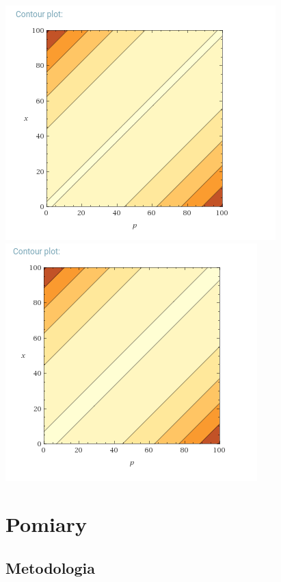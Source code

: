 \documentclass[11pt,twocolumn]{article}
\begin{document}
\includegraphics[width=\linewidth]{08plain.png}
\includegraphics[width=\linewidth]{0999plain.png}

\section{Pomiary}

\subsection{Metodologia}
\end{document}
